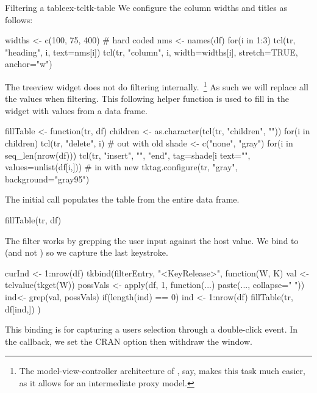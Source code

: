 \begin{example}{Filtering a table}{ex-tcltk-table}
We configure the column widths and titles as follows:
\begin{Schunk}
\begin{Sinput}
 widths <- c(100, 75, 400)            # hard coded
 nms <- names(df)
 for(i in 1:3) {
   tcl(tr, "heading", i, text=nms[i])
   tcl(tr, "column", i, width=widths[i], 
       stretch=TRUE, anchor="w")
 }
\end{Sinput}
\end{Schunk}
%
The treeview widget does not do filtering internally.~\footnote{The
  model-view-controller architecture of \GTK, say, makes this task
  much easier, as it allows for an intermediate proxy model.} As such
we will replace all the values when filtering.  This following helper
function is used to fill in the widget with values from a data frame.
\begin{Schunk}
\begin{Sinput}
 fillTable <- function(tr, df) {
   children <- as.character(tcl(tr, "children", ""))
   for(i in children) tcl(tr, "delete", i)    # out with old
   shade <- c("none", "gray")
   for(i in seq_len(nrow(df))) 
     tcl(tr, "insert", "", "end", tag=shade[i %
         text="",  
         values=unlist(df[i,]))               # in with new
   tktag.configure(tr, "gray", background="gray95")
 }
\end{Sinput}
\end{Schunk}
The initial call populates the table from the entire data frame.
\begin{Schunk}
\begin{Sinput}
 fillTable(tr, df)
\end{Sinput}
\end{Schunk}

The filter works by grepping the user input against the host value. We
bind to  (and not ) so we capture the last keystroke.
\begin{Schunk}
\begin{Sinput}
 curInd <- 1:nrow(df)
 tkbind(filterEntry, "<KeyRelease>", function(W, K) {
   val <- tclvalue(tkget(W))
   possVals <- apply(df, 1, function(...) 
                     paste(..., collapse=" "))
   ind<- grep(val, possVals)
   if(length(ind) == 0) ind <- 1:nrow(df)
   fillTable(tr, df[ind,])
 })
\end{Sinput}
\end{Schunk}
%
This binding is for capturing a users selection through a double-click
event. In the callback, we set the CRAN option then withdraw the window.
\begin{Schunk}
\end{Schunk}
\end{example}


